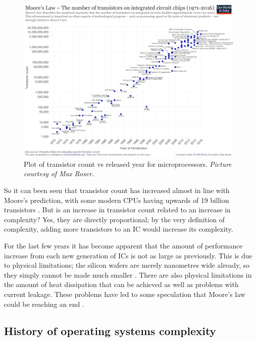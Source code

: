 \begin{figure} \begin{center}
\includegraphics[width=1\linewidth]{pics/moore_law} 
\end{center} 
\caption{Plot of transistor count vs released year for microprocessors. \textit{\small{Picture courtesy of Max Roser.}}}
\label{tran_count_over_time}
\end{figure}

So it can been seen that transistor count has increased almost in line with Moore's prediction, with some modern CPUs having upwards of 19 billion transistors 
\cite{RN80}. But is an increase in transistor count related to an increase in complexity? Yes, they are directly proportional; by the very definition of complexity, adding more transistors to an IC would increase its complexity. 

For the last few years it has become apparent that the amount of performance increase from each new generation of ICs is not as large as previously. This is due to physical limitations; the silicon wafers are merely nanometres wide already, so they simply cannot be made much smaller
\cite{RN141}. There are also physical limitations in the amount of heat dissipation that can be achieved as well as problems with current leakage. These problems have led to some speculation that Moore's law could be reaching an end 
\cite{RN49}.

\subsection{History of operating systems complexity}

